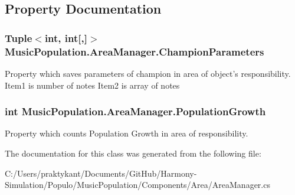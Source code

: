 \subsection{Property Documentation}
\hypertarget{class_music_population_1_1_area_manager_a86c18c633b2331918caed26574120933}{
\subsubsection[{Champion\+Parameters}]{\setlength{\rightskip}{0pt plus 5cm}Tuple$<$int, int\mbox{[},\mbox{]}$>$ Music\+Population.\+Area\+Manager.\+Champion\+Parameters\hspace{0.3cm}{\ttfamily [get]}}}\label{class_music_population_1_1_area_manager_a86c18c633b2331918caed26574120933}


Property which saves parameters of champion in area of object's responsibility. Item1 is number of notes Item2 is array of notes 

\hypertarget{class_music_population_1_1_area_manager_aefd6bf2d6e3330f4648b2e4f1f43bec9}{
\subsubsection[{Population\+Growth}]{\setlength{\rightskip}{0pt plus 5cm}int Music\+Population.\+Area\+Manager.\+Population\+Growth\hspace{0.3cm}{\ttfamily [get]}}}\label{class_music_population_1_1_area_manager_aefd6bf2d6e3330f4648b2e4f1f43bec9}


Property which counts Population Growth in area of responsibility. 



The documentation for this class was generated from the following file\+:\begin{DoxyCompactItemize}
\item 
C\+:/\+Users/praktykant/\+Documents/\+Git\+Hub/\+Harmony-\/\+Simulation/\+Populo/\+Music\+Population/\+Components/\+Area/Area\+Manager.\+cs\end{DoxyCompactItemize}
